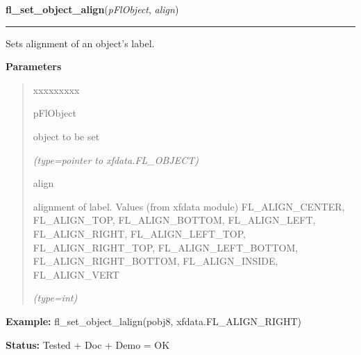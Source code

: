 \hspace{.8\funcindent}\begin{boxedminipage}{\funcwidth}

    \raggedright \textbf{fl\_set\_object\_align}(\textit{pFlObject}, \textit{align})

    \vspace{-1.5ex}

    \rule{\textwidth}{0.5\fboxrule}
\setlength{\parskip}{2ex}
    Sets alignment of an object's label.

\setlength{\parskip}{1ex}
      \textbf{Parameters}
      \vspace{-1ex}

      \begin{quote}
        \begin{Ventry}{xxxxxxxxx}

          \item[pFlObject]

          object to be set

            {\it (type=pointer to xfdata.FL\_OBJECT)}

          \item[align]

          alignment of label. Values (from xfdata module) 
          FL\_ALIGN\_CENTER, FL\_ALIGN\_TOP, FL\_ALIGN\_BOTTOM, 
          FL\_ALIGN\_LEFT, FL\_ALIGN\_RIGHT, FL\_ALIGN\_LEFT\_TOP, 
          FL\_ALIGN\_RIGHT\_TOP, FL\_ALIGN\_LEFT\_BOTTOM, 
          FL\_ALIGN\_RIGHT\_BOTTOM, FL\_ALIGN\_INSIDE, FL\_ALIGN\_VERT

            {\it (type=int)}

        \end{Ventry}

      \end{quote}

\textbf{Example:} fl\_set\_object\_lalign(pobj8, xfdata.FL\_ALIGN\_RIGHT)



\textbf{Status:} Tested + Doc + Demo = OK



    \end{boxedminipage}

    \label{xformslib:flbasic:fl_set_object_shortcut}

    \vspace{0.5ex}

